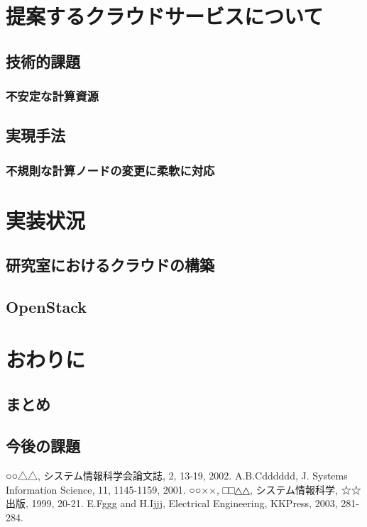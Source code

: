 \section{提案するクラウドサービスについて}
\subsection{技術的課題}
\subsubsection{不安定な計算資源}
\subsection{実現手法}
\subsubsection{不規則な計算ノードの変更に柔軟に対応}

\section{実装状況}
\subsection{研究室におけるクラウドの構築}
\subsection{OpenStack}

\section{おわりに}
\subsection{まとめ}
\subsection{今後の課題}

\begin{thebibliography}{99}
	○○△△, システム情報科学会論文誌, 2, 13-19, 2002.
	A.B.Cdddddd, J. Systems Information Science, 11, 1145-1159, 2001.
	○○××, □□△△, システム情報科学, ☆☆出版, 1999, 20-21.
	E.Fggg and H.Ijjj, Electrical Engineering, KKPress, 2003, 281-284.
\end{thebibliography}

%
%
